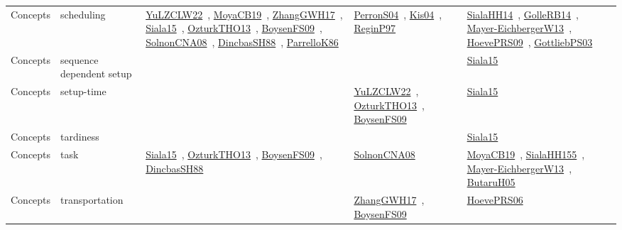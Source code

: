 {\begin{longtable}{lp{3cm}>{\raggedright\arraybackslash}p{6cm}>{\raggedright\arraybackslash}p{6cm}>{\raggedright\arraybackslash}p{8cm}}
Concepts & scheduling & \href{../cars/works/YuLZCLW22.pdf}{YuLZCLW22}~\cite{YuLZCLW22}, \href{../cars/works/MoyaCB19.pdf}{MoyaCB19}~\cite{MoyaCB19}, \href{../cars/works/ZhangGWH17.pdf}{ZhangGWH17}~\cite{ZhangGWH17}, \href{../cars/works/Siala15.pdf}{Siala15}~\cite{Siala15}, \href{../cars/works/OzturkTHO13.pdf}{OzturkTHO13}~\cite{OzturkTHO13}, \href{../cars/works/BoysenFS09.pdf}{BoysenFS09}~\cite{BoysenFS09}, \href{../cars/works/SolnonCNA08.pdf}{SolnonCNA08}~\cite{SolnonCNA08}, \href{../cars/works/DincbasSH88.pdf}{DincbasSH88}~\cite{DincbasSH88}, \href{../cars/works/ParrelloK86.pdf}{ParrelloK86}~\cite{ParrelloK86} & \href{../cars/works/PerronS04.pdf}{PerronS04}~\cite{PerronS04}, \href{../cars/works/Kis04.pdf}{Kis04}~\cite{Kis04}, \href{../cars/works/ReginP97.pdf}{ReginP97}~\cite{ReginP97} & \href{../cars/works/SialaHH14.pdf}{SialaHH14}~\cite{SialaHH14}, \href{../cars/works/GolleRB14.pdf}{GolleRB14}~\cite{GolleRB14}, \href{../cars/works/Mayer-EichbergerW13.pdf}{Mayer-EichbergerW13}~\cite{Mayer-EichbergerW13}, \href{../cars/works/HoevePRS09.pdf}{HoevePRS09}~\cite{HoevePRS09}, \href{../cars/works/GottliebPS03.pdf}{GottliebPS03}~\cite{GottliebPS03}\\
Concepts & sequence dependent setup &  &  & \href{../cars/works/Siala15.pdf}{Siala15}~\cite{Siala15}\\
Concepts & setup-time &  & \href{../cars/works/YuLZCLW22.pdf}{YuLZCLW22}~\cite{YuLZCLW22}, \href{../cars/works/OzturkTHO13.pdf}{OzturkTHO13}~\cite{OzturkTHO13}, \href{../cars/works/BoysenFS09.pdf}{BoysenFS09}~\cite{BoysenFS09} & \href{../cars/works/Siala15.pdf}{Siala15}~\cite{Siala15}\\
Concepts & tardiness &  &  & \href{../cars/works/Siala15.pdf}{Siala15}~\cite{Siala15}\\
Concepts & task & \href{../cars/works/Siala15.pdf}{Siala15}~\cite{Siala15}, \href{../cars/works/OzturkTHO13.pdf}{OzturkTHO13}~\cite{OzturkTHO13}, \href{../cars/works/BoysenFS09.pdf}{BoysenFS09}~\cite{BoysenFS09}, \href{../cars/works/DincbasSH88.pdf}{DincbasSH88}~\cite{DincbasSH88} & \href{../cars/works/SolnonCNA08.pdf}{SolnonCNA08}~\cite{SolnonCNA08} & \href{../cars/works/MoyaCB19.pdf}{MoyaCB19}~\cite{MoyaCB19}, \href{../cars/works/SialaHH155.pdf}{SialaHH155}~\cite{SialaHH155}, \href{../cars/works/Mayer-EichbergerW13.pdf}{Mayer-EichbergerW13}~\cite{Mayer-EichbergerW13}, \href{../cars/works/ButaruH05.pdf}{ButaruH05}~\cite{ButaruH05}\\
Concepts & transportation &  & \href{../cars/works/ZhangGWH17.pdf}{ZhangGWH17}~\cite{ZhangGWH17}, \href{../cars/works/BoysenFS09.pdf}{BoysenFS09}~\cite{BoysenFS09} & \href{../cars/works/HoevePRS06.pdf}{HoevePRS06}~\cite{HoevePRS06}\\
\end{longtable}
}

